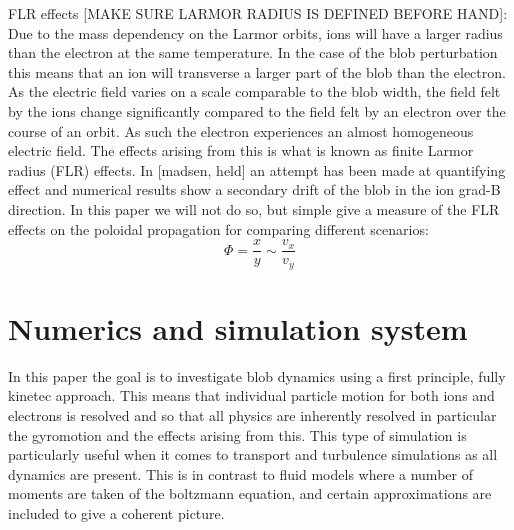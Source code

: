 \documentclass[9pt,twocolumn]{article}
\renewcommand{\=}[1]{\stackrel{#1}{=}} %
\theoremstyle{definition}
\theoremstyle{remark}
\begin{document}
FLR effects [MAKE SURE LARMOR RADIUS IS DEFINED BEFORE HAND]:
Due to the mass dependency on the Larmor orbits, ions will have a larger radius than the electron at the same temperature. In the case of the blob perturbation this means that an ion will transverse a larger part of the blob than the electron. As the electric field varies on a scale comparable to the blob width, the field felt by the ions change significantly compared to the field felt by an electron over the course of an orbit. As such the electron experiences an almost homogeneous electric field. The effects arising from this is what is known as finite Larmor radius (FLR) effects. In [madsen, held] an attempt has been made at quantifying effect and numerical results show a secondary drift of the blob in the ion grad-B direction. In this paper we will not do so, but simple give a measure of the FLR effects on the poloidal propagation for comparing different scenarios:
\begin{equation}
\Phi = \frac{x}{y}\sim \frac{v_x}{v_y}
\end{equation}  

\section{Numerics and simulation system}
In this paper the goal is to investigate blob dynamics using a first principle, fully kinetec approach. This means that individual particle motion for both ions and electrons is resolved and so that all physics are inherently resolved in particular the gyromotion and the effects arising from this. This type of simulation is particularly useful when it comes to transport and turbulence simulations as all dynamics are present.
This is in contrast to fluid models where a number of moments are taken of the boltzmann equation, and certain approximations are included to give a coherent picture.
\end{document}

